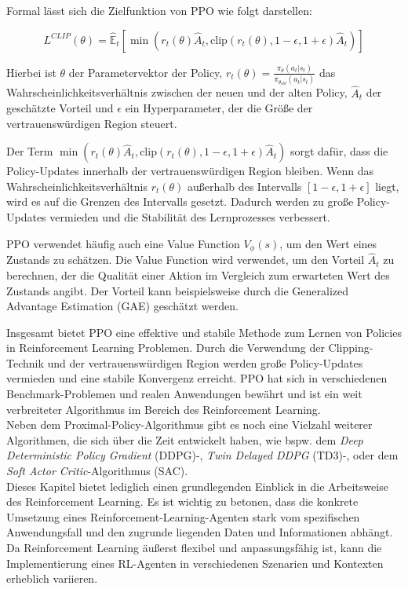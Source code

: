 \documentclass{article}
\theoremstyle{newline}
\begin{document}
\begin{onehalfspace}
Formal lässt sich die Zielfunktion von PPO wie folgt darstellen:

\begin{equation}
	L^{CLIP}(\theta) = \hat{\mathbb{E}}_t \left[ \min(r_t(\theta)\hat{A}_t, \text{clip}(r_t(\theta), 1-\epsilon, 1+\epsilon)\hat{A}_t) \right]
\end{equation}

Hierbei ist $\theta$ der Parametervektor der Policy, $r_t(\theta) = \frac{\pi_\theta(a_t|s_t)}{\pi_{\theta_{old}}(a_t|s_t)}$ das Wahrscheinlichkeitsverhältnis zwischen der neuen und der alten Policy, $\hat{A}_t$ der geschätzte Vorteil und $\epsilon$ ein Hyperparameter, der die Größe der vertrauenswürdigen Region steuert.
\medskip

Der Term $\min(r_t(\theta)\hat{A}_t, \text{clip}(r_t(\theta), 1-\epsilon, 1+\epsilon)\hat{A}_t)$ sorgt dafür, dass die Policy-Updates innerhalb der vertrauenswürdigen Region bleiben. Wenn das Wahrscheinlichkeitsverhältnis $r_t(\theta)$ außerhalb des Intervalls $[1-\epsilon, 1+\epsilon]$ liegt, wird es auf die Grenzen des Intervalls gesetzt. Dadurch werden zu große Policy-Updates vermieden und die Stabilität des Lernprozesses verbessert.
\medskip

PPO verwendet häufig auch eine Value Function $V_\phi(s)$, um den Wert eines Zustands zu schätzen. Die Value Function wird verwendet, um den Vorteil $\hat{A}_t$ zu berechnen, der die Qualität einer Aktion im Vergleich zum erwarteten Wert des Zustands angibt. Der Vorteil kann beispielsweise durch die Generalized Advantage Estimation (GAE) \cite{schulman2015high} geschätzt werden.
\medskip

Insgesamt bietet PPO eine effektive und stabile Methode zum Lernen von Policies in Reinforcement Learning Problemen. Durch die Verwendung der Clipping-Technik und der vertrauenswürdigen Region werden große Policy-Updates vermieden und eine stabile Konvergenz erreicht. PPO hat sich in verschiedenen Benchmark-Problemen und realen Anwendungen bewährt und ist ein weit verbreiteter Algorithmus im Bereich des Reinforcement Learning.
\\

Neben dem Proximal-Policy-Algorithmus gibt es noch eine Vielzahl weiterer Algorithmen, die sich über die Zeit entwickelt haben, wie bspw. dem \textit{Deep Deterministic Policy Gradient} (DDPG)-, \textit{Twin Delayed DDPG} (TD3)-, oder dem \textit{Soft Actor Critic}-Algorithmus (SAC).
\\

Dieses Kapitel bietet lediglich einen grundlegenden Einblick in die Arbeitsweise des Reinforcement Learning. Es ist wichtig zu betonen, dass die konkrete Umsetzung eines Reinforcement-Learning-Agenten stark vom spezifischen Anwendungsfall und den zugrunde liegenden Daten und Informationen abhängt. Da Reinforcement Learning äußerst flexibel und anpassungsfähig ist, kann die Implementierung eines RL-Agenten in verschiedenen Szenarien und Kontexten erheblich variieren. 


\end{onehalfspace}
\end{document}
